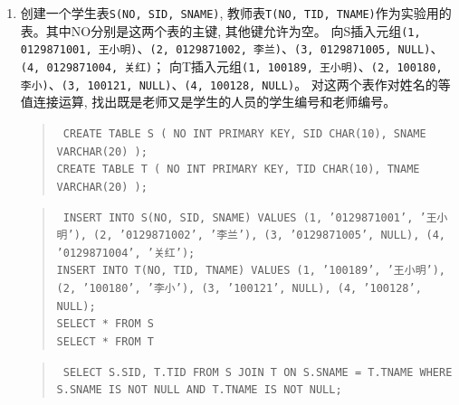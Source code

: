 \documentclass[a4paper,twoside]{article}
\begin{document}
\begin{spacing}{1.2}
\begin{enumerate}
\item 创建一个学生表\texttt{S(NO,  SID,  SNAME)}, 教师表\texttt{T(NO,  TID,  TNAME)}作为实验用的表。其中NO分别是这两个表的主键, 其他键允许为空。
向S插入元组\texttt{(1,  0129871001,  王小明)}、\texttt{(2,  0129871002,  李兰)}、\texttt{(3,  0129871005,  NULL)}、\texttt{(4,  0129871004,  关红)}；
向T插入元组\texttt{(1,  100189,  王小明)}、\texttt{(2,  100180,  李小)}、\texttt{(3,  100121,  NULL)}、\texttt{(4,  100128,  NULL)}。
对这两个表作对姓名的等值连接运算, 找出既是老师又是学生的人员的学生编号和老师编号。 
\begin{quote}
\texttt{
CREATE TABLE S (
    NO INT PRIMARY KEY,
    SID CHAR(10),
    SNAME VARCHAR(20)
);
\\
CREATE TABLE T (
    NO INT PRIMARY KEY,
    TID CHAR(10),
    TNAME VARCHAR(20)
);
}
\end{quote}
\begin{quote}
\texttt{
INSERT INTO S(NO, SID, SNAME) VALUES
(1, '0129871001', '王小明'),
(2, '0129871002', '李兰'),
(3, '0129871005', NULL),
(4, '0129871004', '关红');
\\
INSERT INTO T(NO, TID, TNAME) VALUES
(1, '100189', '王小明'),
(2, '100180', '李小'),
(3, '100121', NULL),
(4, '100128', NULL);
\\
SELECT * FROM S
\\
SELECT * FROM T
}
\end{quote}
\begin{quote}
\texttt{
SELECT S.SID, T.TID
FROM S JOIN T ON S.SNAME = T.TNAME
WHERE S.SNAME IS NOT NULL AND T.TNAME IS NOT NULL;
}
\end{quote}



\end{enumerate}
\end{spacing}
\end{document}
